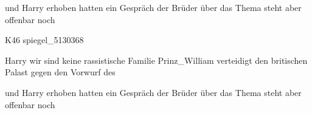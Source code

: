 und Harry erhoben hatten ein Gespräch der Brüder über das Thema steht aber offenbar noch \\

\z


\ea
K46 spiegel\_5130368\\\medskip

Harry wir sind keine rassistische Familie Prinz\_William verteidigt den britischen Palast gegen den Vorwurf des\\\medskip

und Harry erhoben hatten ein Gespräch der Brüder über das Thema steht aber offenbar noch \\

\z

